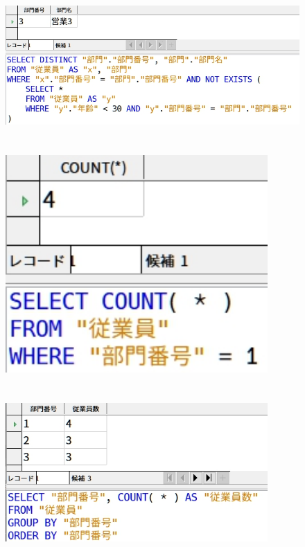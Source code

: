 \documentclass[a4paper,10pt]{jsarticle}
\begin{document}
\section{}
\begin{figure}[H]
  \centering
  \includegraphics[width=\linewidth]{./(4).png}
  \caption{}
  \label{}
\end{figure}

\section{}
\begin{figure}[H]
  \centering
  \includegraphics[width=10cm]{./(5).png}
  \caption{}
  \label{}
\end{figure}


\section{}
\begin{figure}[H]
  \centering
  \includegraphics[width=10cm]{./(6).png}
  \caption{}
  \label{}
\end{figure}
\end{document}
